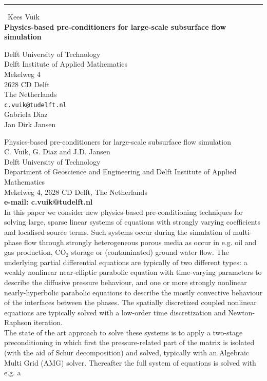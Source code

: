 \documentclass{report}
\begin{document}
\begin{center}
\rule{6in}{1pt} \
{\large Kees Vuik \\
{\bf Physics-based pre-conditioners for large-scale subsurface flow simulation}}

Delft University of Technology \\ Delft Institute of Applied Mathematics \\ Mekelweg 4 \\ 2628 CD Delft \\ The Netherlands
\\
{\tt c.vuik@tudelft.nl}\\
Gabriela Diaz\\
Jan Dirk Jansen \end{center}

\nonumber
\noindent
Physics-based pre-conditioners for large-scale subsurface flow
simulation
\\[2ex]
C. Vuik, G. Diaz and J.D. Jansen\\
Delft University of Technology\\
Department of Geoscience and Engineering
and
Delft Institute of Applied Mathematics\\
Mekelweg 4,
2628 CD Delft,
The Netherlands \\
{\bf e-mail: c.vuik@tudelft.nl}\\
[2ex]
In this paper we consider new physics-based pre-conditioning techniques
for solving large, sparse linear systems of equations with strongly
varying coefficients and localised source terms.
Such systems occur during the simulation of multi-phase flow through
strongly heterogeneous porous media as occur in e.g. oil and gas
production, CO$_2$ storage or (contaminated) ground water flow.
The underlying partial differential equations are typically of two
different types: a weakly nonlinear near-elliptic parabolic equation
with time-varying parameters to describe the diffusive pressure
behaviour, and one or more strongly nonlinear nearly-hyperbolic parabolic
equations to describe the mostly convective behaviour of the interfaces
between the phases.
The spatially discretized coupled nonlinear equations are typically
solved with a low-order time discretization and Newton-Raphson
iteration.
\\[2ex]
The state of the art approach to solve
these systems is to apply a two-stage preconditioning in which first the
pressure-related part of the matrix is isolated (with the aid of Schur
decomposition) and solved, typically with an Algebraic Multi Grid (AMG)
solver. Thereafter the full system of equations is solved with e.g. a
\end{document}
